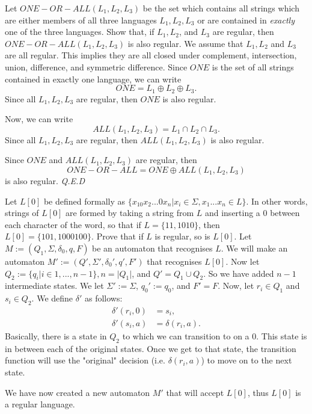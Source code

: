 \documentclass{article}
\begin{document}
\begin{question}{2}{
        Let $ONE-OR-ALL(L_1, L_2, L_3)$ be the set which contains all strings which are
        either members of all three languages $L_1, L_2, L_3$ or are contained in
        \emph{exactly} one of the three languages. Show that, if $L_1, L_2$, and $L_3$ are
        regular, then $ONE-OR-ALL(L_1, L_2, L_3)$ is also regular.
    }
    We assume that $L_1, L_2$ and $L_3$ are all regular. This implies they are all
    closed under complement, intersection, union, difference, and symmetric
    difference. Since $ONE$ is the set of all strings contained in exactly one language,
    we can write
    \[ONE = L_1 \oplus L_2 \oplus L_3.\]
    Since all $L_1, L_2, L_3$ are regular, then $ONE$ is also regular.

    Now, we can write
    \[ALL(L_1, L_2, L_3) = L_1 \cap L_2 \cap L_3.\]
    Since all $L_1, L_2, L_3$ are regular, then $ALL(L_1, L_2, L_3)$ is also regular.

    Since $ONE$ and $ALL(L_1, L_2, L_3)$ are regular, then
    \[ONE-OR-ALL = ONE \oplus ALL(L_1, L_2, L_3)\]
    is also regular. \hfill \textit{Q.E.D}
\end{question}

\begin{question}{3}{
        Let $L[0]$ be defined formally as $\{x_10x_2...0x_n | x_i \in \Sigma, x_1...x_n\in L\}$.
        In other words, strings of $L[0]$ are formed by taking a string from $L$
        and inserting a $0$ between each character of the word, so that if $L = \{11,1010\}$,
        then $L[0] = \{101, 1000100\}$.  Prove that if $L$ is regular, so is $L[0]$.
    }
    Let $M := (Q_1, \Sigma, \delta_0, q, F)$ be an automaton that recognises $L$. We will
    make an automaton $M' := (Q', \Sigma', \delta_0', q', F')$ that recognises $L[0]$. Now let
    $Q_2 := \{q_i | i \in 1,...,n-1\}, n = |Q_1|$, and $Q' = Q_1 \cup Q_2$. So we have added $n-1$
    intermediate states. We let $\Sigma' := \Sigma$, $q_0' := q_0$, and $F' = F$.
    Now, let $r_i \in Q_1$ and $s_i \in Q_2$. We define $\delta'$ as follows:
    \begin{align*}
        \delta'(r_i, 0) & = s_i,            \\
        \delta'(s_i, a) & = \delta(r_i, a).
    \end{align*}
    Basically, there is a state in $Q_2$ to which we can transition to on a 0.
    This state is in between each
    of the original states. Once we get to that state, the transition function will use the
    "original" decision (i.e. $\delta(r_i, a)$) to move on to the next state.

    We have now created a new automaton $M'$ that will accept $L[0]$, thus $L[0]$ is a
    regular language.
\end{question}
\end{document}
